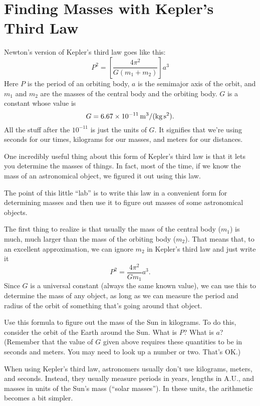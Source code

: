 \section{Finding Masses with Kepler's Third Law}

\makelabheader

Newton's version of Kepler's third law goes like this:
$$
P^2=\left[ \frac{4\pi^2}{G(m_1+m_2)}\right]a^3
$$
Here $P$ is the period of an orbiting body, $a$ is the semimajor axis
of the orbit, and $m_1$ and $m_2$ are the masses of the central body
and the orbiting body.  $G$ is a constant whose value is
$$
G=6.67\times 10^{-11}\,{\rm m^3/(kg\,s^2)}.
$$
All the stuff after the $10^{-11}$ is just the units of $G$.
It signifies that we're using seconds for our times, kilograms for
our masses, and meters for our distances.

One incredibly useful thing about this form of Kepler's third law
is that it lets you determine the masses of things.  In fact, most
of the time, if we know the mass of an astronomical object, we figured
it out using this law.

The point of this little ``lab'' is to write this law in a convenient
form for determining masses and then use it to figure out 
masses of some astronomical objects.

The first thing to realize is that usually the mass of the central
body ($m_1$) is much, much larger than the mass of the orbiting
body ($m_2$).  That means that, to an excellent approximation, we can
ignore $m_2$ in Kepler's third law and just write it
$$
P^2=\frac{4\pi^2}{Gm_1}a^3.
$$
Since $G$ is a universal constant (always the same known value), 
we can use this to determine the mass of any object, as long as we 
can measure the period and radius of the orbit of something
that's going around that object.

Use this formula to figure out the mass of the Sun in kilograms.  To do this,
consider the orbit of the Earth around the Sun.  What is $P$?
What is $a$?  (Remember that the value of $G$ given above requires
these quantities to be in seconds and meters. You may need to look
up a number or two. That's OK.)

\answerspace{2in}

When using Kepler's third law, astronomers usually don't use kilograms,
meters, and seconds.  Instead, they usually measure periods in years,
lengths in A.U., and masses in units of the Sun's mass (``solar masses'').
In these units, the arithmetic becomes a bit simpler.

